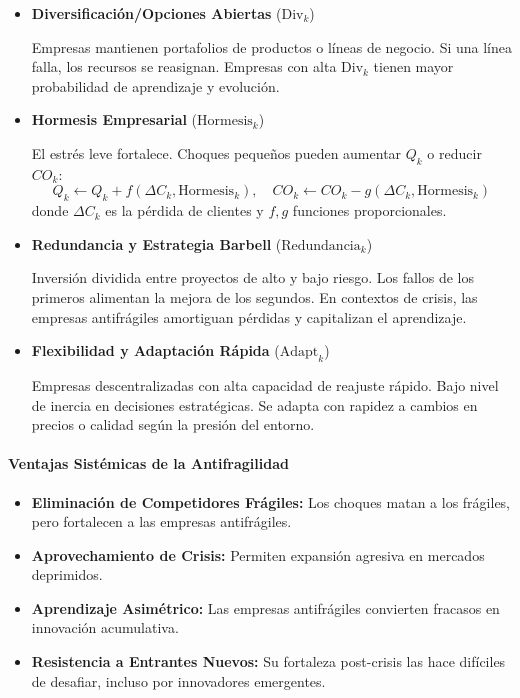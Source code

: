 \documentclass[a4paper,12pt]{article}
\begin{document}
\begin{itemize}
    \item \textbf{Diversificación/Opciones Abiertas} ($\text{Div}_k$)

    Empresas mantienen portafolios de productos o líneas de negocio. Si una línea falla, los recursos se reasignan. Empresas con alta $\text{Div}_k$ tienen mayor probabilidad de aprendizaje y evolución.

    \item \textbf{Hormesis Empresarial} ($\text{Hormesis}_k$)

    El estrés leve fortalece. Choques pequeños pueden aumentar $Q_k$ o reducir $CO_k$:
    \[
    Q_k \leftarrow Q_k + f(\Delta C_k, \text{Hormesis}_k), \quad CO_k \leftarrow CO_k - g(\Delta C_k, \text{Hormesis}_k)
    \]
    donde $\Delta C_k$ es la pérdida de clientes y $f,g$ funciones proporcionales.

    \item \textbf{Redundancia y Estrategia Barbell} ($\text{Redundancia}_k$)

    Inversión dividida entre proyectos de alto y bajo riesgo. Los fallos de los primeros alimentan la mejora de los segundos. En contextos de crisis, las empresas antifrágiles amortiguan pérdidas y capitalizan el aprendizaje.

    \item \textbf{Flexibilidad y Adaptación Rápida} ($\text{Adapt}_k$)

    Empresas descentralizadas con alta capacidad de reajuste rápido. Bajo nivel de inercia en decisiones estratégicas. Se adapta con rapidez a cambios en precios o calidad según la presión del entorno.

\end{itemize}

\paragraph{Ventajas Sistémicas de la Antifragilidad}

\begin{itemize}
    \item \textbf{Eliminación de Competidores Frágiles:} Los choques matan a los frágiles, pero fortalecen a las empresas antifrágiles.
    \item \textbf{Aprovechamiento de Crisis:} Permiten expansión agresiva en mercados deprimidos.
    \item \textbf{Aprendizaje Asimétrico:} Las empresas antifrágiles convierten fracasos en innovación acumulativa.
    \item \textbf{Resistencia a Entrantes Nuevos:} Su fortaleza post-crisis las hace difíciles de desafiar, incluso por innovadores emergentes.
\end{itemize}
\end{document}
